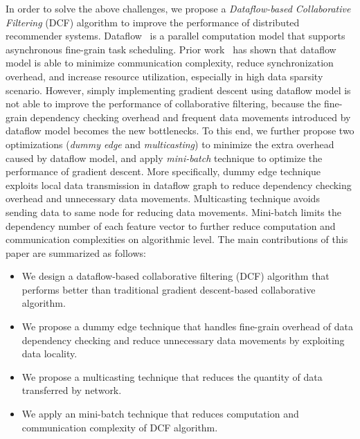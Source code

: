 \documentclass{llncs}
\begin{document}
In order to solve the above challenges, we propose a {\it Dataflow-based Collaborative Filtering} (DCF) algorithm to improve the performance of distributed recommender systems. Dataflow~\cite{dataflow} is a parallel computation model that
supports asynchronous fine-grain task scheduling. Prior work~\cite{codelet} has shown that dataflow model is able to minimize communication complexity, reduce synchronization overhead, and increase resource utilization, especially in high data sparsity scenario. However, simply implementing gradient descent using dataflow model is not able to improve the performance of collaborative filtering, because the fine-grain dependency checking overhead and frequent data movements introduced by dataflow model becomes the new bottlenecks.
To this end, we further propose two optimizations ({\it dummy edge} and {\it multicasting}) to minimize the extra overhead caused by dataflow model, and apply {\it mini-batch} technique to optimize the performance of gradient descent. More specifically, dummy edge technique exploits local data transmission in dataflow graph to reduce dependency checking overhead and unnecessary data movements. Multicasting technique avoids sending data to same node for reducing data movements. Mini-batch limits the dependency number of each feature vector to further reduce computation and communication complexities on algorithmic level. The main contributions of this paper are summarized as follows:

\vspace{-5pt}
\begin{itemize}
\item We design a dataflow-based collaborative filtering (DCF) algorithm that performs better than traditional gradient descent-based collaborative algorithm.
\item We propose a dummy edge technique that handles fine-grain overhead of data dependency checking and reduce unnecessary data movements by exploiting  data locality.
\item We propose a multicasting technique that reduces the quantity of data transferred by network.
\item We apply an mini-batch technique that reduces computation and communication complexity of DCF algorithm.
\end{itemize}
\vspace{-5pt}
\end{document}
